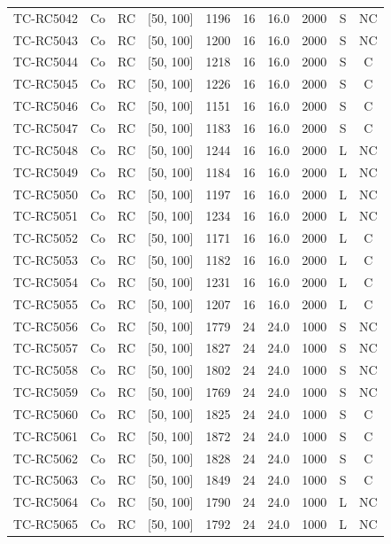 \begin{longtable}{lccccccccc}
TC-RC5042 & Co & RC & [50, 100] & 1196 & 16 & 16.0 & 2000 & S & NC \\
TC-RC5043 & Co & RC & [50, 100] & 1200 & 16 & 16.0 & 2000 & S & NC \\
TC-RC5044 & Co & RC & [50, 100] & 1218 & 16 & 16.0 & 2000 & S & C \\
TC-RC5045 & Co & RC & [50, 100] & 1226 & 16 & 16.0 & 2000 & S & C \\
TC-RC5046 & Co & RC & [50, 100] & 1151 & 16 & 16.0 & 2000 & S & C \\
TC-RC5047 & Co & RC & [50, 100] & 1183 & 16 & 16.0 & 2000 & S & C \\
TC-RC5048 & Co & RC & [50, 100] & 1244 & 16 & 16.0 & 2000 & L & NC \\
TC-RC5049 & Co & RC & [50, 100] & 1184 & 16 & 16.0 & 2000 & L & NC \\
TC-RC5050 & Co & RC & [50, 100] & 1197 & 16 & 16.0 & 2000 & L & NC \\
TC-RC5051 & Co & RC & [50, 100] & 1234 & 16 & 16.0 & 2000 & L & NC \\
TC-RC5052 & Co & RC & [50, 100] & 1171 & 16 & 16.0 & 2000 & L & C \\
TC-RC5053 & Co & RC & [50, 100] & 1182 & 16 & 16.0 & 2000 & L & C \\
TC-RC5054 & Co & RC & [50, 100] & 1231 & 16 & 16.0 & 2000 & L & C \\
TC-RC5055 & Co & RC & [50, 100] & 1207 & 16 & 16.0 & 2000 & L & C \\
TC-RC5056 & Co & RC & [50, 100] & 1779 & 24 & 24.0 & 1000 & S & NC \\
TC-RC5057 & Co & RC & [50, 100] & 1827 & 24 & 24.0 & 1000 & S & NC \\
TC-RC5058 & Co & RC & [50, 100] & 1802 & 24 & 24.0 & 1000 & S & NC \\
TC-RC5059 & Co & RC & [50, 100] & 1769 & 24 & 24.0 & 1000 & S & NC \\
TC-RC5060 & Co & RC & [50, 100] & 1825 & 24 & 24.0 & 1000 & S & C \\
TC-RC5061 & Co & RC & [50, 100] & 1872 & 24 & 24.0 & 1000 & S & C \\
TC-RC5062 & Co & RC & [50, 100] & 1828 & 24 & 24.0 & 1000 & S & C \\
TC-RC5063 & Co & RC & [50, 100] & 1849 & 24 & 24.0 & 1000 & S & C \\
TC-RC5064 & Co & RC & [50, 100] & 1790 & 24 & 24.0 & 1000 & L & NC \\
TC-RC5065 & Co & RC & [50, 100] & 1792 & 24 & 24.0 & 1000 & L & NC \\

\end{longtable}
